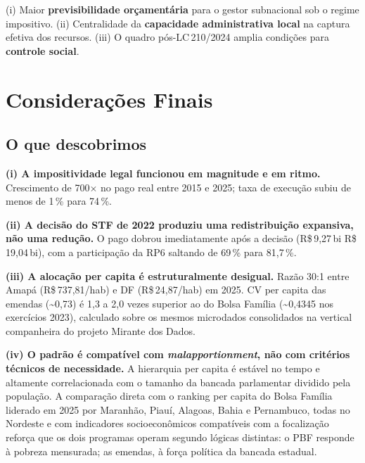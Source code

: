 \documentclass[12pt,a4paper,oneside]{article}
\newcommand{\rs}{R\$\,}
\begin{document}
(i) Maior \textbf{previsibilidade orçamentária} para o gestor
subnacional sob o regime impositivo. (ii) Centralidade da
\textbf{capacidade administrativa local} na captura efetiva dos
recursos. (iii) O quadro pós-LC\,210/2024 amplia condições para
\textbf{controle social}.

\section{Considerações Finais}\label{sec:conclusao}

\subsection{O que descobrimos}

\textbf{(i) A impositividade legal funcionou em magnitude e em ritmo.}
Crescimento de 700$\times$ no pago real entre 2015 e 2025; taxa de
execução subiu de menos de 1\,\% para 74\,\%.

\textbf{(ii) A decisão do STF de 2022 produziu uma redistribuição
expansiva, não uma redução.} O pago dobrou imediatamente após a
decisão (\rs 9{,}27\,bi \textrightarrow{} \rs 19{,}04\,bi), com a
participação da RP6 saltando de 69\,\% para 81{,}7\,\%.

\textbf{(iii) A alocação per capita é estruturalmente desigual.}
Razão 30:1 entre Amapá (R\$\,737{,}81/hab) e DF (R\$\,24{,}87/hab) em
2025. CV per capita das emendas (\textasciitilde 0{,}73) é
1{,}3 a 2{,}0 vezes superior ao do Bolsa Família
(\textasciitilde 0{,}4345 nos exercícios 2023),
calculado sobre os mesmos microdados consolidados na vertical
companheira do projeto Mirante dos Dados.

\textbf{(iv) O padrão é compatível com \textit{malapportionment}, não
com critérios técnicos de necessidade.} A hierarquia per capita é
estável no tempo e altamente correlacionada com o tamanho da bancada
parlamentar dividido pela população. A comparação direta com o
ranking per capita do Bolsa Família \textemdash{} liderado em 2025
por Maranhão, Piauí, Alagoas, Bahia e Pernambuco, todas no Nordeste
e com indicadores socioeconômicos compatíveis com a focalização
\textemdash{} reforça que os dois programas operam segundo lógicas
distintas: o PBF responde à pobreza mensurada; as emendas, à força
política da bancada estadual.
\end{document}
